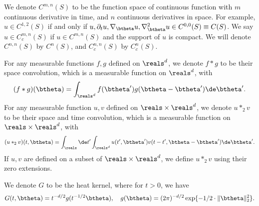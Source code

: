 \documentclass[11pt]{article}
\begin{document}
We denote $C^{m, n}(S)$ to be the function space of continuous function with $m$ continuous derivative in time, and $n$ continuous derivatives in space. For example, $u \in C^{1,2}(S)$ if and only if $u, \partial_t u, \nabla_\btheta u, \nabla_\btheta^2 u \in C^{0, 0}(S) \equiv C(S)$. We say $u \in C_c^{m, n}(S)$ if $u \in C^{m, n}(S)$ and the support of $u$ is compact. We will denote $C^{n, n}(S)$ by $C^n(S)$, and $C^{n,n}_c(S)$ by $C^n_c(S)$. 



For any measurable functions $f, g$ defined on $\reals^d$, we denote $f * g$ to be their space convolution, which is a measurable function on $\reals^d$, with 
\begin{align}
(f * g)(\btheta) = \int_{\reals^d} f(\btheta') g(\btheta - \btheta') \de \btheta'. 
\end{align}
For any measurable function $u, v$ defined on $\reals \times \reals^d$, we denote $u *_2 v$ to be their space and time convolution, which is a measurable function on $\reals \times \reals^d$, with 
\begin{align}
(u *_2 v)(t, \btheta) = \int_{\reals} \de t' \int_{\reals^d} u(t', \btheta') v(t- t', \btheta - \btheta') \de \btheta'. 
\end{align}
If $u, v$ are defined on a subset of $\reals \times \reals^d$, we define $u *_2 v$ using their zero extensions. 

We denote $G$ to be the heat kernel, where for $t > 0$, we have 
\begin{align}
G(t, \btheta) = t^{- d/2} g(t^{-1/2} \btheta), ~~~ g(\btheta) = (2 \pi )^{- d/2} \exp\{ - 1/2 \cdot \| \btheta \|_2^2 \}.
\end{align}
\end{document}
